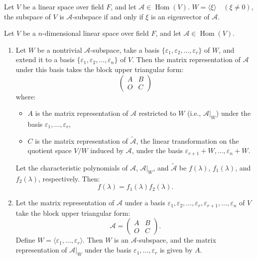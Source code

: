 \documentclass[11pt]{../../TexTemplate/elegantbook} %
\begin{document}
\begin{proposition}
    Let \( V \) be a linear space over field \( F \), and let \( \mathcal{A}\in \operatorname{Hom}(V) \).
    \( W = \langle \xi \rangle \quad (\xi\neq 0)\), the subspace of \( V \) is \( \mathcal{A} \)-subspace if and only if 
    \( \xi \) is an eigenvector of \( \mathcal{A} \).
\end{proposition}

\begin{theorem}
    Let \( V \) be a \(n\)-dimensional linear space over field \( F \), and let \( \mathcal{A}\in \operatorname{Hom}(V) \).
    \begin{enumerate}
        \item Let \( W \) be a nontrivial \( \mathcal{A} \)-subspace,
            take a basis \( \{\varepsilon_1, \varepsilon_2, \dots, \varepsilon_r\} \) of \( W \),
            and extend it to a basis \( \{\varepsilon_1, \varepsilon_2, \dots, \varepsilon_n\} \) of \( V \).
            Then the matrix representation of \( \mathcal{A} \) under this basis takes the block upper triangular form:
            \[
            \begin{pmatrix}
                A & B \\
                O & C
            \end{pmatrix}
            \]
            where:
            \begin{itemize}
                \item \( A \) is the matrix representation of \( \mathcal{A} \) restricted to \( W \) (i.e., \( \mathcal{A}|_W \)) 
                    under the basis \(\varepsilon_1, \dots, \varepsilon_r\),
                \item \( C \) is the matrix representation of \( \widetilde{\mathcal{A}} \), 
                    the linear transformation on the quotient space \( V/W \) induced by \( \mathcal{A} \), 
                    under the basis \(\varepsilon_{r+1} + W, \dots, \varepsilon_n + W\).
            \end{itemize}
            Let the characteristic polynomials of \( \mathcal{A} \), \( \mathcal{A}|_W \), and \( \widetilde{\mathcal{A}} \) 
            be \( f(\lambda) \), \( f_1(\lambda) \), and \( f_2(\lambda) \), respectively. Then:
            \[ 
            f(\lambda) = f_1(\lambda) f_2(\lambda).
            \]
    
        \item Let the matrix representation of \( \mathcal{A} \) under a basis 
            \(\varepsilon_1, \varepsilon_2, \dots, \varepsilon_r, \varepsilon_{r+1}, \dots, \varepsilon_n\) 
            of \( V \) take the block upper triangular form:
            \[
            \mathcal{A} = 
            \begin{pmatrix}
            A & B \\
            O & C
            \end{pmatrix}.
            \]
            Define \( W = \langle \varepsilon_1, \dots, \varepsilon_r \rangle \). 
            Then \( W \) is an \( \mathcal{A} \)-subspace, 
            and the matrix representation of \( \mathcal{A}|_W \)
            under the basis \(\varepsilon_1, \dots, \varepsilon_r\) is given by \( A \).
        

\end{enumerate}
\end{theorem}
\end{document}
